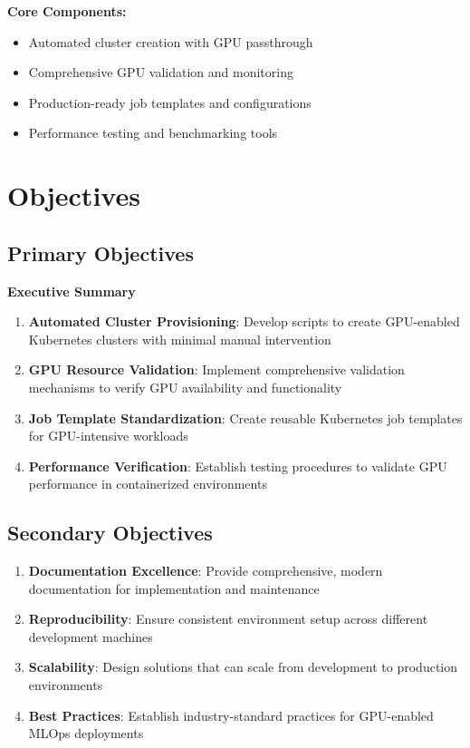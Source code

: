 \documentclass[12pt,a4paper]{report}
\begin{document}
\textbf{Core Components:}
\begin{itemize}
    \item \textcolor{primarycolor}{\textbullet} Automated cluster creation with GPU passthrough
    \item \textcolor{primarycolor}{\textbullet} Comprehensive GPU validation and monitoring
    \item \textcolor{primarycolor}{\textbullet} Production-ready job templates and configurations
    \item \textcolor{primarycolor}{\textbullet} Performance testing and benchmarking tools
\end{itemize}

\chapter{Objectives}
\label{chap:objectives}

\section{Primary Objectives}
\begin{center}
\textbf{Executive Summary}
\end{center}

\vspace{0.3cm}

\begin{enumerate}
    \item \textbf{Automated Cluster Provisioning}: Develop scripts to create GPU-enabled Kubernetes clusters with minimal manual intervention
    \item \textbf{GPU Resource Validation}: Implement comprehensive validation mechanisms to verify GPU availability and functionality
    \item \textbf{Job Template Standardization}: Create reusable Kubernetes job templates for GPU-intensive workloads
    \item \textbf{Performance Verification}: Establish testing procedures to validate GPU performance in containerized environments
\end{enumerate}

\section{Secondary Objectives}
\begin{enumerate}
    \item \textbf{Documentation Excellence}: Provide comprehensive, modern documentation for implementation and maintenance
    \item \textbf{Reproducibility}: Ensure consistent environment setup across different development machines
    \item \textbf{Scalability}: Design solutions that can scale from development to production environments
    \item \textbf{Best Practices}: Establish industry-standard practices for GPU-enabled MLOps deployments
\end{enumerate}
\end{document}
